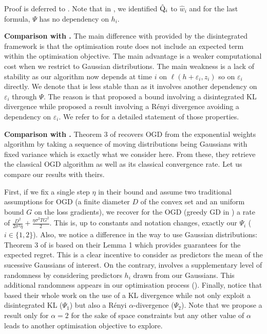 Proof is deferred to . Note that in , we identified $\hat{\mathrm{Q}}_i$ to $\hat{w}_i$ and for the last formula, $\Psi$ has no dependency on $h_i$.

\textbf{Comparison with .} The main difference with  provided by the disintegrated framework is that the optimisation route does not include an expected term within the optimisation objective. The main advantage is a weaker computational cost when we restrict to Gaussian distributions. The main weakness is a lack of stability as our algorithm now depends at time $i$ on $\ell(h+\varepsilon_i,z_i)$ so on $\varepsilon_i$ directly.
We denote that  is less stable than  as it involves another dependency on $\varepsilon_i$ through $\Psi$.
The reason is that \cite{rivasplata2020pac} proposed a bound involving a disintegrated KL divergence while \cite{viallard2023general} proposed a result involving a Rényi divergence avoiding a dependency on $\varepsilon_i$. We refer to  for a detailed statement of those properties.

\textbf{Comparison with \cite{hoeven2018many}.} Theorem 3 of \citet{hoeven2018many} recovers OGD from the exponential weights algorithm by taking a sequence of moving distributions being Gaussians with fixed variance which is exactly what we consider here. From these, they retrieve the classical OGD algorithm as well as its classical convergence rate. Let us compare our results with theirs.

First, if we fix a single step $\eta$ in their bound and assume two traditional assumptions for OGD (a finite diameter $D$ of the convex set and an uniform bound $G$ on the loss gradients), we recover for the OGD (greedy GD in \citealp{hoeven2018many}) a rate of $ \frac{D^2}{2\sigma^2\eta} + \frac{\eta\sigma^2TG^2}{2}$. This is, up to constants and notation changes, exactly our $\Psi_i$ ($i\in\{1,2\}$).
Also, we notice a difference in the way to use Gaussian distributions: Theorem 3 of \citet{hoeven2018many} is based on their Lemma 1 which provides guarantees for the expected regret. This is a clear incentive to consider as predictors the mean of the sucessive Gaussians of interest. On the contrary,  involves a supplementary level of randomness by considering predictors $h_i$ drawn from our Gaussians. This additional randomness appears in our optimisation process ().
Finally, notice that \citet{hoeven2018many} based their whole work on the use of a KL divergence  while  not only exploit a disintegrated KL ($\Psi_1$) but also a Rényi $\alpha$-divergence ($\Psi_2$). Note that we propose a result only for $\alpha=2$ for the sake of space constraints but any other value of $\alpha$ leads to another optimisation objective to explore.


